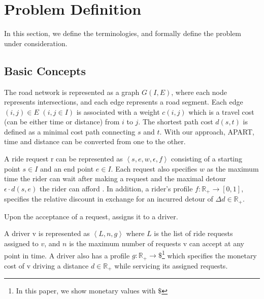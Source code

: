 \section{Problem Definition}
\label{sec:problem_def}

In this section, we define the terminologies, and formally define the problem under consideration.

\subsection{Basic Concepts}
The road network is represented as a graph $G(I, E)$, where each node represents intersections, and each edge represents a road segment. 
Each edge $(i,j) \in E$ $(i, j \in I)$ is associated with a weight $c(i,j)$ which is a travel cost (can be either time or distance) from $i$ to $j$.
The shortest path cost $d(s,t)$ is defined as a minimal cost path connecting $s$ and $t$. With our approach, APART, time and distance can be converted from one to the other.

\begin{definition} 
\label{def:req}
	A ride request r can be represented as $\left\langle s, e, w, \epsilon, f \right\rangle$ consisting of a starting point $s \in I$ and an end point $e \in I$. Each request also specifies $w$ as the maximum time the rider can wait after making a request and the maximal detour $\epsilon\cdot d(s, e)$ the rider can afford . In addition, a rider's profile $f: \mathbb{R}_{+} \rightarrow \left[ 0, 1 \right] $, specifies the relative discount in exchange for an incurred detour of $\Delta d \in \mathbb{R}_{+}$.
\end{definition}

Upon the acceptance of a request, \fname assigns it to a driver.

\begin{definition} [Driver]
A driver v is represented as $\left\langle L, n, g \right\rangle$ where $L$ is the list of ride requests assigned to $v$, and $n$ is the maximum number of requests v can accept at any point in time. A driver also has a profile $g: \mathbb{R}_{+}  \rightarrow \$ $\footnote{In this paper, we show monetary values with $\$ $} which specifies the monetary cost of v driving a distance $d \in \mathbb{R}_{+}$ while servicing its assigned requests.
\end{definition} 


